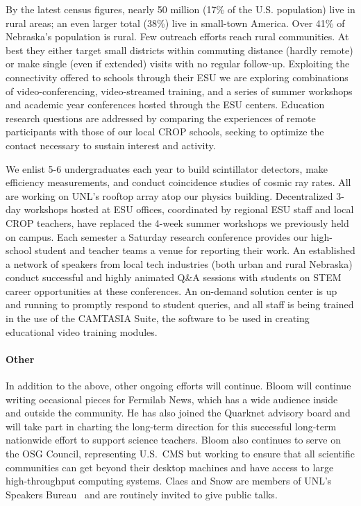 By the latest census figures, nearly 50 million (17\% of the U.S. population) live in rural areas; an even larger total (38\%) live in small-town America.  Over 41\% of Nebraska's population is rural. Few outreach efforts reach rural communities. At best they either target small districts within commuting distance (hardly remote) or make single (even if extended) visits with no regular follow-up. Exploiting the connectivity offered to schools through their ESU we are exploring combinations of video-conferencing, video-streamed training, and a series of summer workshops and academic year conferences hosted through the ESU centers. Education research questions are addressed by comparing the experiences of remote participants with those of our local CROP schools, seeking to optimize the contact necessary to sustain interest and activity.

We enlist 5-6 undergraduates each year to build scintillator detectors, make efficiency measurements, and conduct coincidence studies of cosmic ray rates.  All are working on UNL’s rooftop array atop our physics building. Decentralized 3-day workshops hosted at ESU offices, coordinated by regional ESU staff and local CROP teachers, have replaced the 4-week summer workshops we previously held on campus. Each semester a Saturday research conference provides our high-school student and teacher teams a venue for reporting their work. An established a network of speakers from local tech industries (both urban and rural Nebraska) conduct successful and highly animated Q\&A sessions with students on STEM career opportunities at these conferences. An on-demand solution center is up and running to promptly respond to student queries, and all staff is being trained in the use of the CAMTASIA Suite, the software to be used in creating educational video training modules.

\paragraph{Other} In addition to the above, other ongoing efforts will continue.  Bloom will continue writing occasional pieces for Fermilab News, which has a wide audience inside and outside the community.  He has also joined the Quarknet advisory board and will take part in charting the long-term direction for this successful long-term nationwide effort to support science teachers.  Bloom also continues to serve on the OSG Council, representing U.S.~CMS but working to ensure that all scientific communities can get beyond their desktop machines and have access to large high-throughput computing systems.  Claes and Snow are members of UNL's Speakers Bureau~\cite{bib:speakers} and are routinely invited to give public talks.
